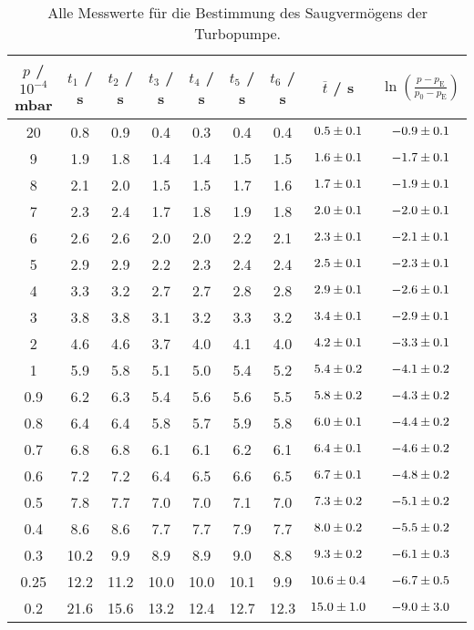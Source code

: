 \begin{table} %
  \centering
  \caption{Alle Messwerte für die Bestimmung des Saugvermögens der Turbopumpe.}
  \label{tab:ptturbo}
  \begin{tabular}{c|c|c|c|c|c|c|c|c}
    $p$ / $10^{-4}$ mbar & $t_1$ / s & $t_2$ / s & $t_3$ / s & $t_4$ / s & $t_5$ / s & $t_6$ / s & $\overline{t}$ / s & $\ln\left( \frac{p-p_\text{E}}{p_0-p_\text{E}} \right)$ \\
    \midrule
    20   & 0.8  & 0.9  & 0.4  & 0.3  & 0.4  & 0.4  & $\num{0.5 +- 0.1}$ & $\num{-0.9 +-0.1 }$ \\
    9    & 1.9  & 1.8  & 1.4  & 1.4  & 1.5  & 1.5  & $\num{1.6 +- 0.1}$ & $\num{-1.7 +- 0.1}$ \\
    8    & 2.1  & 2.0  & 1.5  & 1.5  & 1.7  & 1.6  & $\num{1.7 +- 0.1}$ & $\num{-1.9 +- 0.1}$ \\
    7    & 2.3  & 2.4  & 1.7  & 1.8  & 1.9  & 1.8  & $\num{2.0 +- 0.1}$ & $\num{-2.0 +- 0.1}$ \\
    6    & 2.6  & 2.6  & 2.0  & 2.0  & 2.2  & 2.1  & $\num{2.3 +- 0.1}$ & $\num{-2.1 +- 0.1}$ \\
    5    & 2.9  & 2.9  & 2.2  & 2.3  & 2.4  & 2.4  & $\num{2.5 +- 0.1}$ & $\num{-2.3 +- 0.1}$ \\
    4    & 3.3  & 3.2  & 2.7  & 2.7  & 2.8  & 2.8  & $\num{2.9 +- 0.1}$ & $\num{-2.6 +- 0.1}$ \\
    3    & 3.8  & 3.8  & 3.1  & 3.2  & 3.3  & 3.2  & $\num{3.4 +- 0.1}$ & $\num{-2.9 +- 0.1}$ \\
    2    & 4.6  & 4.6  & 3.7  & 4.0  & 4.1  & 4.0  & $\num{4.2 +- 0.1}$ & $\num{-3.3 +- 0.1}$ \\
    \hline
    1    & 5.9  & 5.8  & 5.1  & 5.0  & 5.4  & 5.2  & $\num{5.4 +- 0.2}$ & $\num{-4.1 +- 0.2}$ \\
    0.9  & 6.2  & 6.3  & 5.4  & 5.6  & 5.6  & 5.5  & $\num{5.8 +- 0.2}$ & $\num{-4.3 +- 0.2}$ \\
    0.8  & 6.4  & 6.4  & 5.8  & 5.7  & 5.9  & 5.8  & $\num{6.0 +- 0.1}$ & $\num{-4.4 +- 0.2}$ \\
    0.7  & 6.8  & 6.8  & 6.1  & 6.1  & 6.2  & 6.1  & $\num{6.4 +- 0.1}$ & $\num{-4.6 +- 0.2}$ \\
    0.6  & 7.2  & 7.2  & 6.4  & 6.5  & 6.6  & 6.5  & $\num{6.7 +- 0.1}$ & $\num{-4.8 +- 0.2}$ \\
    0.5  & 7.8  & 7.7  & 7.0  & 7.0  & 7.1  & 7.0  & $\num{7.3 +- 0.2}$ & $\num{-5.1 +- 0.2}$ \\
    0.4  & 8.6  & 8.6  & 7.7  & 7.7  & 7.9  & 7.7  & $\num{8.0 +- 0.2}$ & $\num{-5.5 +- 0.2}$ \\
    \hline
    0.3  & 10.2 & 9.9  & 8.9  & 8.9  & 9.0  & 8.8  & $\num{9.3 +- 0.2}$ & $\num{-6.1 +- 0.3}$ \\
    0.25 & 12.2 & 11.2 & 10.0 & 10.0 & 10.1 & 9.9  & $\num{10.6 +- 0.4}$ & $\num{-6.7 +- 0.5}$ \\
    0.2  & 21.6 & 15.6 & 13.2 & 12.4 & 12.7 & 12.3 & $\num{15.0 +- 1.0}$ & $\num{-9.0 +- 3.0}$ \\
  \end{tabular}
\end{table}

